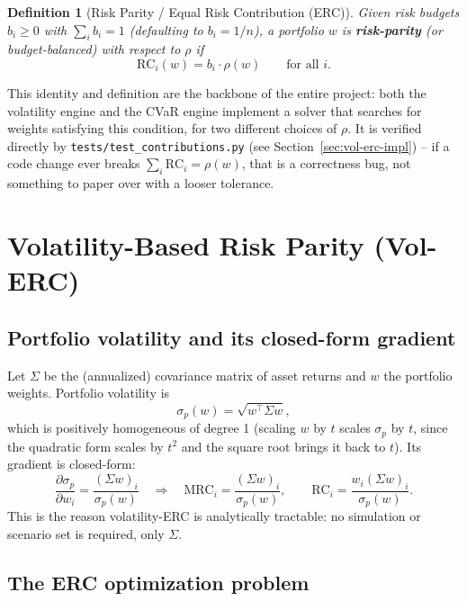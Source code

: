 \documentclass[11pt]{article}
\newtheorem{definition}{Definition}
\begin{document}
\begin{definition}[Risk Parity / Equal Risk Contribution (ERC)]
Given risk budgets $b_i \geq 0$ with $\sum_i b_i = 1$ (defaulting to
$b_i = 1/n$), a portfolio $w$ is \textbf{risk-parity} (or budget-balanced)
with respect to $\rho$ if
\[
\text{RC}_i(w) = b_i \cdot \rho(w) \qquad \text{for all } i.
\]
\end{definition}

This identity and definition are the backbone of the entire project: both
the volatility engine and the CVaR engine implement a solver that searches
for weights satisfying this condition, for two different choices of
$\rho$. It is verified directly by
\texttt{tests/test\_contributions.py} (see
Section~\ref{sec:vol-erc-impl}) -- if a code change ever breaks
$\sum_i \text{RC}_i = \rho(w)$, that is a correctness bug, not something to
paper over with a looser tolerance.

\section{Volatility-Based Risk Parity (Vol-ERC)}
\label{sec:vol-erc}

\subsection{Portfolio volatility and its closed-form gradient}

Let $\Sigma$ be the (annualized) covariance matrix of asset returns and
$w$ the portfolio weights. Portfolio volatility is
\[
\sigma_p(w) = \sqrt{w^\top \Sigma w},
\]
which is positively homogeneous of degree 1 (scaling $w$ by $t$ scales
$\sigma_p$ by $t$, since the quadratic form scales by $t^2$ and the square
root brings it back to $t$). Its gradient is closed-form:
\[
\frac{\partial \sigma_p}{\partial w_i} = \frac{(\Sigma w)_i}{\sigma_p(w)}
\quad\Longrightarrow\quad
\text{MRC}_i = \frac{(\Sigma w)_i}{\sigma_p(w)}, \qquad
\text{RC}_i = \frac{w_i (\Sigma w)_i}{\sigma_p(w)} .
\]
This is the reason volatility-ERC is analytically tractable: no
simulation or scenario set is required, only $\Sigma$.

\subsection{The ERC optimization problem}
\end{document}
